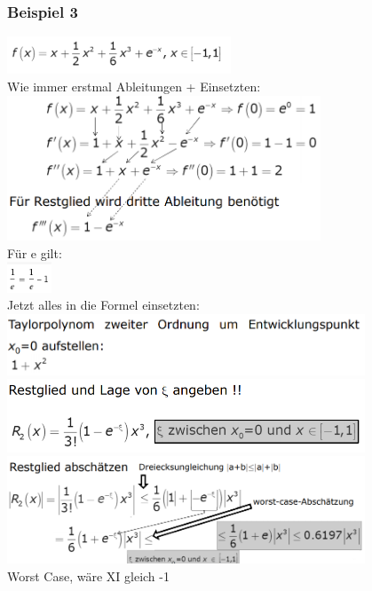 \documentclass[12pt,a4paper]{article}
\begin{document}
\subsubsection{Beispiel 3}
\includegraphics[width=0.5\textwidth]{BIlder/V1/29.png}\\
Wie immer erstmal Ableitungen + Einsetzten:\\
\includegraphics[width=0.7\textwidth]{BIlder/V1/30.png}\\
Für e gilt:\\
\includegraphics[width=0.1\textwidth]{BIlder/V1/31.png}\\
Jetzt alles in die Formel einsetzten:\\
\includegraphics[width=0.8\textwidth]{BIlder/V1/32.png}\\
\includegraphics[width=0.8\textwidth]{BIlder/V1/33.png}\\
\includegraphics[width=0.8\textwidth]{BIlder/V1/34.png}\\
Worst Case, wäre XI gleich -1\\
\end{document}
